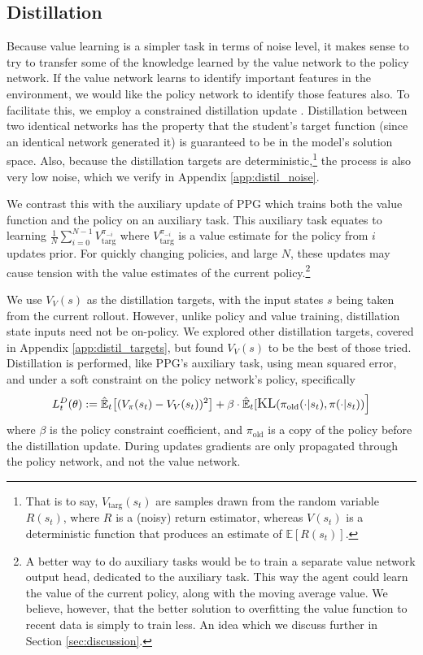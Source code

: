 \documentclass{article}
\begin{document}
\subsection{Distillation}
\label{sec:distillation}

Because value learning is a simpler task in terms of noise level, it makes sense to try to transfer some of the knowledge learned by the value network to the policy network. If the value network learns to identify important features in the environment, we would like the policy network to identify those features also. To facilitate this, we employ a constrained distillation update \cite{hinton2015distilling}. Distillation between two identical networks has the property that the student's target function (since an identical network generated it) is guaranteed to be in the model's solution space. Also, because the distillation targets are deterministic,\footnote{That is to say, $V_\text{targ}(s_t)$ are samples drawn from the random variable $R(s_t)$, where $R$ is a (noisy) return estimator, whereas $V(s_t)$ is a deterministic function that produces an estimate of $\mathbb{E}[R(s_t)]$.} the process is also very low noise, which we verify in Appendix \ref{app:distil_noise}.

We contrast this with the auxiliary update of PPG which trains both the value function and the policy on an auxiliary task. This auxiliary task equates to learning $\frac{1}{N}\sum_{i=0}^{N-1}{V_\text{targ}^{\pi_{-i}}}$ where $V_\text{targ}^{\pi_{-i}}$ is a value estimate for the policy from $i$ updates prior. For quickly changing policies, and large $N$, these updates may cause tension with the value estimates of the current policy.\footnote{A better way to do auxiliary tasks would be to train a separate value network output head, dedicated to the auxiliary task. This way the agent could learn the value of the current policy, along with the moving average value. We believe, however, that the better solution to overfitting the value function to recent data is simply to train less. An idea which we discuss further in Section \ref{sec:discussion}.}

We use $V_V(s)$ as the distillation targets, with the input states $s$ being taken from the current rollout. However, unlike policy and value training, distillation state inputs need not be on-policy. We explored other distillation targets, covered in Appendix \ref{app:distil_targets}, but found $V_V(s)$ to be the best of those tried. Distillation is performed, like PPG's auxiliary task, using mean squared error, and under a soft constraint on the policy network's policy, specifically
\begin{equation}
    L_t^{D}(\theta) := \mathbb{\hat{E}}_t \big[(V_\pi(s_t)-V_V(s_t))^2 \big] +
    \beta \cdot \mathbb{\hat{E}}_t\large[ \text{KL}(\pi_\text{old}(\cdot|s_t), \pi(\cdot|s_t)) \big]
\end{equation}
where $\beta$ is the policy constraint coefficient, and $\pi_\text{old}$ is a copy of the policy before the distillation update. During updates gradients are only propagated through the policy network, and not the value network.
\end{document}
